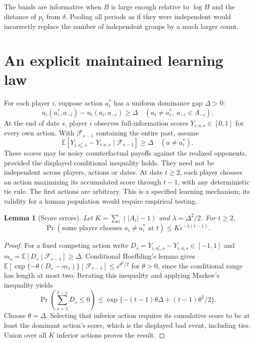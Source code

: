 \documentclass[11pt]{article}
\newtheorem{lemma}[theorem]{Lemma}
\theoremstyle{remark}
\newcommand{\E}{\mathbb E}
\begin{document}
The bands are informative when $B$ is large enough relative to $\log H$ and the distance of $p_t$ from $\delta$. Pooling all periods as if they were independent would incorrectly replace the number of independent groups by a much larger count.

\section{An explicit maintained learning law}
For each player $i$, suppose action $a_i^*$ has a uniform dominance gap $\Delta>0$:
\[
 u_i(a_i^*,a_{-i})-u_i(a_i,a_{-i})\geq\Delta
 \quad(a_i\ne a_i^*,\ a_{-i}\in A_{-i}).
\]
At the end of date $s$, player $i$ observes full-information scores $Y_{i,a,s}\in[0,1]$ for every own action. With $\mathcal F_{s-1}$ containing the entire past, assume
\[
 \E[Y_{i,a_i^*,s}-Y_{i,a,s}\mid\mathcal F_{s-1}]\geq\Delta
 \quad(a\ne a_i^*).
\]
These scores may be noisy counterfactual payoffs against the realized opponents, provided the displayed conditional inequality holds. They need not be independent across players, actions or dates. At date $t\geq2$, each player chooses an action maximizing its accumulated score through $t-1$, with any deterministic tie rule. The first actions are arbitrary. This is a specified learning mechanism; its validity for a human population would require empirical testing.

\begin{lemma}[Score errors]\label{score}
Let $K=\sum_i(|A_i|-1)$ and $\lambda=\Delta^2/2$. For $t\geq2$,
\[
 \Pr(\text{some player chooses }a_i\ne a_i^*\text{ at }t)
 \leq K e^{-\lambda(t-1)}.
\]
\end{lemma}
\begin{proof}
For a fixed competing action write $D_s=Y_{i,a_i^*,s}-Y_{i,a,s}\in[-1,1]$ and $m_s=\E[D_s\mid\mathcal F_{s-1}]\geq\Delta$. Conditional Hoeffding's lemma gives
$\E[\exp\{-\theta(D_s-m_s)\}\mid\mathcal F_{s-1}]\leq e^{\theta^2/2}$ for $\theta>0$, since the conditional range has length at most two. Iterating this inequality and applying Markov's inequality yields
\[
 \Pr\left(\sum_{s=1}^{t-1}D_s\leq0\right)
 \leq\exp\{-(t-1)\theta\Delta+(t-1)\theta^2/2\}.
\]
Choose $\theta=\Delta$. Selecting that inferior action requires its cumulative score to be at least the dominant action's score, which is the displayed bad event, including ties. Union over all $K$ inferior actions proves the result.
\end{proof}
\end{document}
